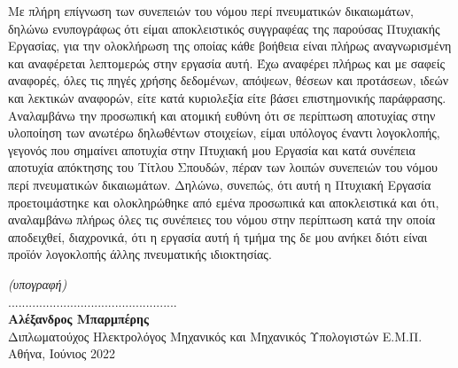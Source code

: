 \noindent
Με πλήρη επίγνωση των συνεπειών του νόμου περί πνευματικών δικαιωμάτων, δηλώνω ενυπογράφως
ότι είμαι αποκλειστικός συγγραφέας της παρούσας Πτυχιακής Εργασίας, για την ολοκλήρωση της οποίας
κάθε βοήθεια είναι πλήρως αναγνωρισμένη και αναφέρεται λεπτομερώς στην εργασία αυτή. Έχω
αναφέρει πλήρως και με σαφείς αναφορές, όλες τις πηγές χρήσης δεδομένων, απόψεων, θέσεων και
προτάσεων, ιδεών και λεκτικών αναφορών, είτε κατά κυριολεξία είτε βάσει επιστημονικής παράφρασης.
Αναλαμβάνω την προσωπική και ατομική ευθύνη ότι σε περίπτωση αποτυχίας στην υλοποίηση των
ανωτέρω δηλωθέντων στοιχείων, είμαι υπόλογος έναντι λογοκλοπής, γεγονός που σημαίνει αποτυχία
στην Πτυχιακή μου Εργασία και κατά συνέπεια αποτυχία απόκτησης του Τίτλου Σπουδών, πέραν των
λοιπών συνεπειών του νόμου περί πνευματικών δικαιωμάτων. Δηλώνω, συνεπώς, ότι αυτή η Πτυχιακή
Εργασία προετοιμάστηκε και ολοκληρώθηκε από εμένα προσωπικά και αποκλειστικά και ότι,
αναλαμβάνω πλήρως όλες τις συνέπειες του νόμου στην περίπτωση κατά την οποία αποδειχθεί,
διαχρονικά, ότι η εργασία αυτή ή τμήμα της δε μου ανήκει διότι είναι προϊόν λογοκλοπής άλλης
πνευματικής ιδιοκτησίας.
\vfill

\vspace{0.3cm}
\indent \indent \indent
\scriptsize{\textit{(υπογραφή)}}
\normalsize
\vspace{1.2cm}\\
\noindent
................................................. \\[10pt]
\textbf{Αλέξανδρος Μπαρμπέρης} \\
Διπλωματούχος Ηλεκτρολόγος Μηχανικός και Μηχανικός Υπολογιστών Ε.Μ.Π. \\[5pt]
\noindent
Αθήνα, Ιούνιος 2022
